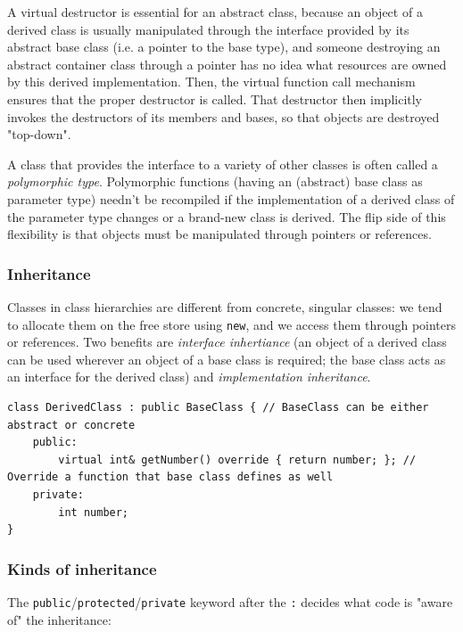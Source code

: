 \documentclass[table, xcdraw]{article}%
\begin{document}
A virtual destructor is essential for an abstract class, because an object of a derived class is usually manipulated through the interface provided by its abstract base class (i.e. a pointer to the base type), and someone destroying an abstract container class through a pointer has no idea what resources are owned by this derived implementation. Then, the virtual function call mechanism ensures that the proper destructor is called. That destructor then implicitly invokes the destructors of its members and bases, so that objects are destroyed "top-down".

A class that provides the interface to a variety of other classes is often called a \textit{polymorphic type}. Polymorphic functions (having an (abstract) base class as parameter type) needn't be recompiled if the implementation of a derived class of the parameter type changes or a brand-new class is derived. The flip side of this flexibility is that objects must be manipulated through pointers or references.

\subsubsection{Inheritance}

Classes in class hierarchies are different from concrete, singular classes: we tend to allocate them on the free store using \texttt{new}, and we access them through pointers or references. Two benefits are \textit{interface inhertiance} (an object of a derived class can be used wherever an object of a base class is required; the base class acts as an interface for the derived class) and \textit{implementation inheritance}.

\begin{verbatim}
class DerivedClass : public BaseClass { // BaseClass can be either abstract or concrete
    public:
        virtual int& getNumber() override { return number; }; // Override a function that base class defines as well
    private:
        int number;
}
\end{verbatim}

\subsubsection{Kinds of inheritance}

The \texttt{public}/\texttt{protected}/\texttt{private} keyword after the \texttt{:} decides what code is "aware of" the inheritance:
\end{document}

